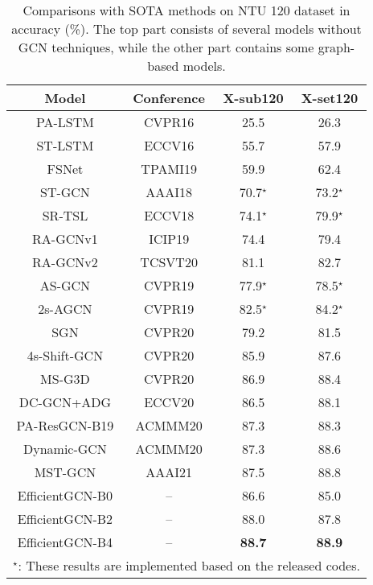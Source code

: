 \documentclass[10pt,journal,compsoc]{IEEEtran}
\begin{document}
\begin{table}[t]
  \caption{Comparisons with SOTA methods on NTU 120 dataset in accuracy (\%). The top part consists of several models without GCN techniques, while the other part contains some graph-based models.}
  \label{tab:ntu120}
  \vspace{-0.4cm}
  \centering
  \setlength{\tabcolsep}{4pt}
  \renewcommand{\arraystretch}{1.2}
  \begin{tabular}{cc|cc}
  \toprule
  Model & Conference & X-sub120 & X-set120 \\
  \midrule
  PA-LSTM \cite{shahroudy2016ntu} & CVPR16 & 25.5 & 26.3 \\
  ST-LSTM \cite{liu2016spatio} & ECCV16 & 55.7 & 57.9 \\
  FSNet \cite{liu2019skeleton} & TPAMI19 & 59.9 & 62.4 \\
  \midrule
  ST-GCN \cite{yan2018spatial} & AAAI18 & 70.7$^\star$ & 73.2$^\star$ \\
  SR-TSL \cite{si2018skeleton} & ECCV18 & 74.1$^\star$ & 79.9$^\star$ \\
  RA-GCNv1 \cite{song2019richly} & ICIP19 & 74.4 & 79.4 \\
  RA-GCNv2 \cite{song2020richly} & TCSVT20 & 81.1 & 82.7 \\
  AS-GCN \cite{li2019actional} & CVPR19 & 77.9$^\star$ & 78.5$^\star$ \\
  2s-AGCN \cite{shi2019two} & CVPR19 & 82.5$^\star$ & 84.2$^\star$ \\
  SGN \cite{zhang2020semantics} & CVPR20 & 79.2 & 81.5 \\
  4s-Shift-GCN \cite{cheng2020skeleton} & CVPR20 & 85.9 & 87.6 \\
  MS-G3D \cite{liu2020disentangling} & CVPR20 & 86.9 & 88.4 \\
  DC-GCN+ADG \cite{cheng2020decoupling} & ECCV20 & 86.5 & 88.1 \\
  PA-ResGCN-B19 \cite{song2020stronger} & ACMMM20 & 87.3 & 88.3 \\
  Dynamic-GCN \cite{ye2020dynamic} & ACMMM20 & 87.3 & 88.6 \\
  MST-GCN \cite{chen2021multi} & AAAI21 & 87.5 & 88.8 \\
  \midrule
  EfficientGCN-B0 & -- & 86.6 & 85.0 \\
  EfficientGCN-B2 & -- & 88.0 & 87.8 \\
  EfficientGCN-B4 & -- & {\bf 88.7} & {\bf 88.9} \\
  \bottomrule
  \multicolumn{4}{l}{$^\star$: These results are implemented based on the released codes.}\\
  \end{tabular}
\end{table}
\end{document}
